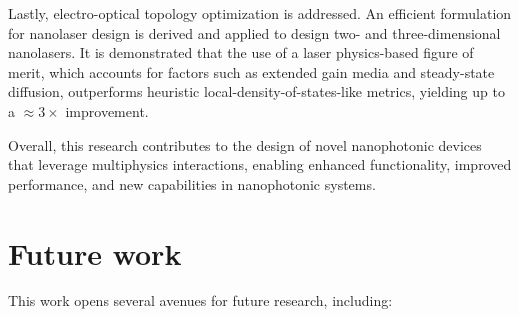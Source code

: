 Lastly, electro-optical topology optimization is addressed. An efficient formulation for nanolaser design is derived and applied to design two- and three-dimensional nanolasers. It is demonstrated that the use of
 a laser physics-based figure of merit, which accounts for factors such as extended gain media and steady-state diffusion, outperforms
  heuristic local-density-of-states-like metrics, yielding up to a $\approx 3\times$ improvement.

Overall, this research contributes to the design of novel nanophotonic devices that leverage multiphysics interactions, enabling enhanced functionality, improved performance, and new capabilities in nanophotonic systems.

\section{Future work}

This work opens several avenues for future research, including:

